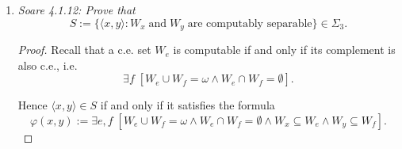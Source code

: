 \documentclass{article}
\begin{document}
\begin{enumerate}[label={\bf Q\arabic*:}]
\begin{proof}
      Hence, we have an effective enumeration of all the $n$-c.e. sets
      $\{Z_e^n\}_{e\in\omega}$, and also an effective enumeration of their
      corresponding computable sequences $\{A_{e,s}^n\}_{e\in\omega}$ that
      witness their $n$-c.e.-ness. Following the hint, we apply a
      diagonalization argument to construct a $(n+1)$-c.e. set which is
      not $n$-c.e. Using the enumeration $\{A_{e,s}^n\}_{e\in\omega}$, we
      construct a recursive sequence $D_s(x)$ that witness the
      $(n+1)$-c.e.-ness of a set $B$, such that $D(e)\neq Z^n_e(e)$ for each
      $e\in\omega$:
      \begin{align*}
        D_s(e) :=
        \begin{cases}
          0 &\text{if}\; s=0,\\
          0 &\text{if}\; s>0\; \text{and}\; A_{e,s}(e)=1,\\
          1 &\text{if}\; s>0\; \text{and}\; A_{e,s}(e)=0.\\
        \end{cases}
      \end{align*}

      Then $D=\lim_sD_s$ is $(n+1)$-c.e. because each $Z_e^n$ is $n$-c.e.
      Also, from construction, $D(e)\neq Z_e^n(e)$ for any $e\in\omega$.
    \end{proof}

  \item \it Soare 4.1.12: Prove that
    \[S:= \{\langle x,y\rangle: W_x\; \text{and}\; W_y\; \text{are
    computably separable}\} \in \Sigma_3.\]

    \begin{proof}
      Recall that a c.e. set $W_e$ is computable if and only if its
      complement is also c.e., i.e.
      \[\exists f\; \left[W_{e}\cup W_{f}=\omega \wedge
      W_{e}\cap W_{f}=\emptyset\right].\]

      Hence $\langle x,y\rangle\in S$ if and only if it satisfies the
      formula
      \[\varphi(x,y):= \exists e,f\; \left[W_{e}\cup W_{f}=\omega \wedge
      W_{e}\cap W_{f}=\emptyset \wedge W_x\subseteq W_e \wedge
      W_y\subseteq W_f\right].\]


\end{proof}
\end{enumerate}
\end{document}
